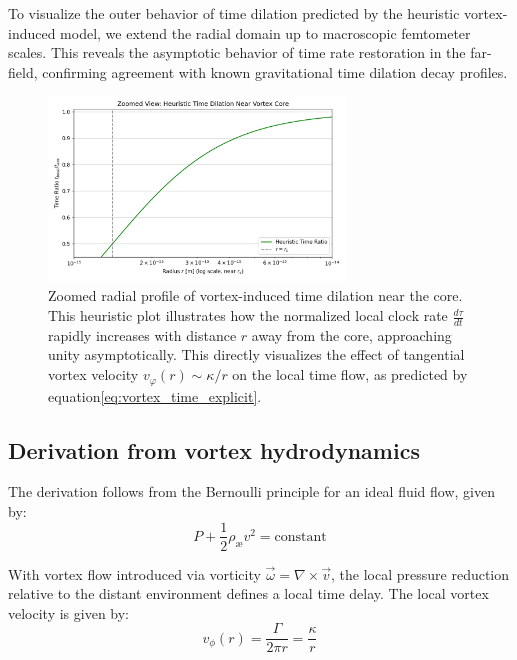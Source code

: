 To visualize the outer behavior of time dilation predicted by the heuristic vortex-induced model, we extend the radial domain up to macroscopic femtometer scales. This reveals the asymptotic behavior of time rate restoration in the far-field, confirming agreement with known gravitational time dilation decay profiles.

\begin{figure}[H]
    \centering
    \includegraphics[width=0.7\textwidth]{images/06-HeuristicTimeDilation4}
    \caption{
        Zoomed radial profile of vortex-induced time dilation near the core.
        This heuristic plot illustrates how the normalized local clock rate
        $\frac{d\tau}{dt}$ rapidly increases with distance $r$ away from the core,
        approaching unity asymptotically. This directly visualizes the effect of
        tangential vortex velocity $v_\varphi(r) \sim \kappa / r$ on the local time flow,
        as predicted by equation\eqref{eq:vortex_time_explicit}.
    }
    \label{fig:HeuristicTimeDilation}
\end{figure}

\subsection{Derivation from vortex hydrodynamics}

The derivation follows from the Bernoulli principle for an ideal fluid flow, given by:
\begin{equation}\label{eq:Bernoulli}
P + \frac{1}{2}\rho_\text{\ae} v^2 = \text{constant}
\end{equation}

With vortex flow introduced via vorticity $\vec{\omega} = \nabla \times \vec{v}$, the local pressure reduction relative to the distant environment defines a local time delay. The local vortex velocity is given by:
\begin{equation}\label{eq:tangential_velocity}
v_{\phi}(r) = \frac{\Gamma}{2\pi r} = \frac{\kappa}{r}
\end{equation}

